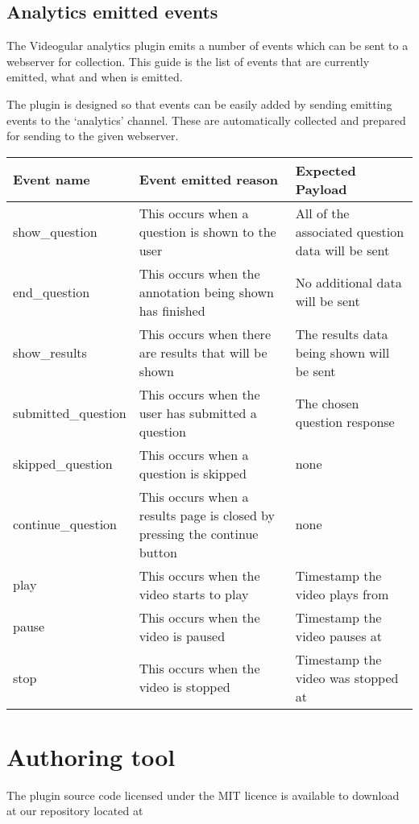 \documentclass[12pt,a4paper]{article}
\begin{document}
\subsection{Analytics emitted events}

The Videogular analytics plugin emits a number of events which can be sent to a webserver for collection. This guide is the list of events that are currently emitted, what and when is emitted.

The plugin is designed so that events can be easily added by sending emitting events to the `analytics' channel. These are automatically collected and prepared for sending to the given webserver.

\begin{tabular}{p{3.2cm} p{7cm} p{4cm}}

\textbf{Event name} & \textbf{Event emitted reason} & \textbf{Expected Payload} \\ 
\hline 
show\_question & This occurs when a question is shown to the user & All of the associated question data will be sent \\ 
\hline 
end\_question & This occurs when the annotation being shown has finished & No additional data will be sent \\ 
\hline 
show\_results & This occurs when there are results that will be shown & The results data being shown will be sent \\ 
\hline 
submitted\_question & This occurs when the user has submitted a question & The chosen question response \\ 
\hline 
skipped\_question & This occurs when a question is skipped & none \\ 
\hline 
continue\_question & This occurs when a results page is closed by pressing the continue button & none \\ 
\hline 
play & This occurs when the video starts to play & Timestamp the video plays from \\ 
\hline 
pause & This occurs when the video is paused & Timestamp the video pauses at \\ 
\hline 
stop & This occurs when the video is stopped & Timestamp the video was stopped at \\
\end{tabular} 


\section{Authoring tool}

The plugin source code licensed under the MIT licence is available to download at our repository located at 
\end{document}
